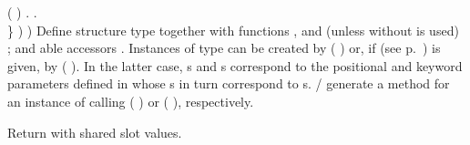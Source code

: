 \begin{LIST}{1cm}
{{{{{            ( )
          }{.}
        }{.}\\
      }{\}}%
      )%
    }
    )}
  {
  Define structure type  together with functions
  ,  and (unless 
  without  is used)
  ; and able accessors
  \LIT{-}. Instances of type  can be
  created by ( ) or, if  (see
  p.\ \pageref{section:Functions}) is given, by (
   ). In the latter
  case, s and \kwd{:}s correspond to the positional
  and keyword parameters defined in  whose s
  in turn correspond to s.
  / generate a
   method for an instance  of 
  calling (  ) or (
    ), respectively.
  }

  {
  Return  with shared slot values.
  }

\end{LIST}



